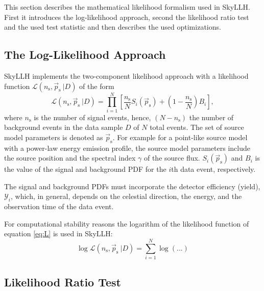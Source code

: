 \documentclass{article}
\newcommand{\ns}{n_{\mathrm{s}}}
\newcommand{\ps}{\vec{p}_{\mathrm{s}}}
\begin{document}
This section describes the mathematical likelihood formalism used in SkyLLH.
First it introduces the log-likelihood approach, second the likelihood ratio
test and the used test statistic and then describes the used optimizations.

\subsection{The Log-Likelihood Approach}

SkyLLH implements the two-component likelihood approach with a likelihood
function $\mathcal{L}(n_{\mathrm{s}},\vec{p}_{\mathrm{s}}~|D)$ of the form
\begin{equation}
 \mathcal{L}(\ns,\ps~|D) = \prod_{i=1}^{N}\left[ \frac{\ns}{N} S_{i}(\ps) + (1 - \frac{\ns}{N}) B_{i} \right],
\label{eq:L}
\end{equation}
where $\ns$ is the number of signal events, hence, $(N-\ns)$ the number of
background events in the data sample $D$ of $N$ total events.
The set of source model parameters is denoted as $\ps$. For example for a
point-like source
model with a power-law energy emission profile, the source model parameters
include the source position and the spectral index $\gamma$ of the source flux.
$S_i(\ps)$ and $B_i$ is the value of the signal and background PDF for the $i$th
data event, respectively.

The signal and background PDFs must incorporate the detector efficiency (yield),
$\mathcal{Y}_i$, which, in general, depends on the celestial direction, the
energy, and the observation time of the data event.

For computational stability reasons the logarithm of the likelihood function of
equation \ref{eq:L} is used in SkyLLH:
\begin{equation}
 \log \mathcal{L}(\ns,\ps~|D) = \sum_{i=1}^{N} \log (...)
\end{equation}

\subsection{Likelihood Ratio Test}
\end{document}
